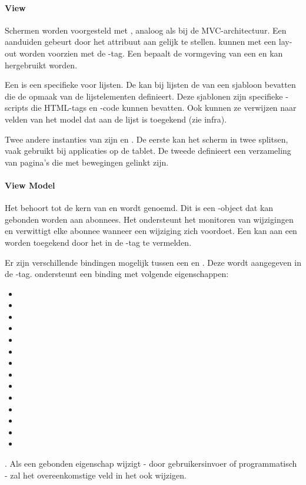 \paragraph{View}
Schermen worden voorgesteld met ,  analoog als bij de MVC-architectuur.
Een  aanduiden gebeurt door het attribuut  aan  gelijk te stellen.
 kunnen met een lay-out worden voorzien met de -tag.
Een  bepaalt de vormgeving van een  en kan hergebruikt worden.

Een  is een specifieke  voor lijsten.
De  kan bij lijsten de  van een sjabloon bevatten die de opmaak van de lijstelementen definieert.
Deze sjablonen zijn specifieke \kendo{}-scripts die HTML-tags en \js{}-code kunnen bevatten.
Ook kunnen ze verwijzen naar velden van het model dat aan de lijst is toegekend (zie infra).

Twee andere instanties van  zijn  en .
De eerste kan het scherm in twee  splitsen,  vaak gebruikt bij applicaties op de tablet.
De tweede definieert een verzameling van pagina's die met bewegingen gelinkt zijn.

\paragraph{View Model}
Het  behoort tot de kern van \kendo{} en wordt  genoemd.
Dit is een \js{}-object dat kan gebonden worden aan abonnees.
Het ondersteunt het monitoren van wijzigingen en verwittigt elke abonnee wanneer een wijziging zich voordoet.
Een  kan aan een  worden toegekend door het in de -tag te vermelden.

Er zijn verschillende bindingen	 mogelijk tussen een  en .
Deze wordt aangegeven in de -tag.
\kendo{} ondersteunt een binding met volgende eigenschappen:  
\begin{itemize}
  \item {}
  \item {}
  \item {}
  \item {}
  \item {}
  \item {}
  \item {}
  \item {}
  \item {}
  \item {}
  \item {}
  \item {}
  \item {}
  \item {}
\end{itemize}.
Als een gebonden eigenschap wijzigt - door gebruikersinvoer of programmatisch - zal het overeenkomstige veld in het  ook wijzigen.

